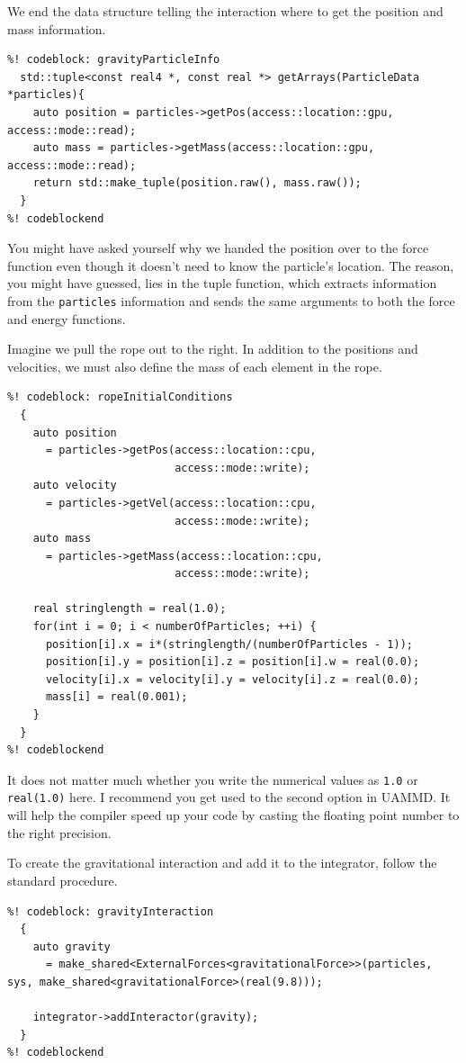 We end the data structure telling the interaction where to get the position and
mass information.
\begin{lstlisting}
%! codeblock: gravityParticleInfo
  std::tuple<const real4 *, const real *> getArrays(ParticleData *particles){
    auto position = particles->getPos(access::location::gpu, access::mode::read);
    auto mass = particles->getMass(access::location::gpu, access::mode::read);
    return std::make_tuple(position.raw(), mass.raw());
  }
%! codeblockend
\end{lstlisting}
You might have asked yourself why we handed the position over to the force
function even though it doesn't need to know the particle's location. The reason,
you might have guessed, lies in the tuple function, which extracts information
from the \texttt{particles} information and sends the same arguments to both the
force and energy functions.

Imagine we pull the rope out to the right. In addition to the positions and
velocities, we must also define the mass of each element in the rope.
\begin{lstlisting}
%! codeblock: ropeInitialConditions
  {
    auto position
      = particles->getPos(access::location::cpu,
                          access::mode::write);
    auto velocity
      = particles->getVel(access::location::cpu,
                          access::mode::write);
    auto mass
      = particles->getMass(access::location::cpu,
                          access::mode::write);

    real stringlength = real(1.0);
    for(int i = 0; i < numberOfParticles; ++i) {
      position[i].x = i*(stringlength/(numberOfParticles - 1));
      position[i].y = position[i].z = position[i].w = real(0.0);
      velocity[i].x = velocity[i].y = velocity[i].z = real(0.0);
      mass[i] = real(0.001);
    }
  }
%! codeblockend
\end{lstlisting}
It does not matter much whether you write the numerical values as \texttt{1.0}
or \texttt{real(1.0)} here. I recommend you get used to the second option in
UAMMD. It will help the compiler speed up your code by casting the floating
point number to the right precision.

To create the gravitational interaction and add it to the integrator, follow the
standard procedure.
\begin{lstlisting}
%! codeblock: gravityInteraction
  {
    auto gravity
      = make_shared<ExternalForces<gravitationalForce>>(particles, sys, make_shared<gravitationalForce>(real(9.8)));

    integrator->addInteractor(gravity);
  }
%! codeblockend
\end{lstlisting}

